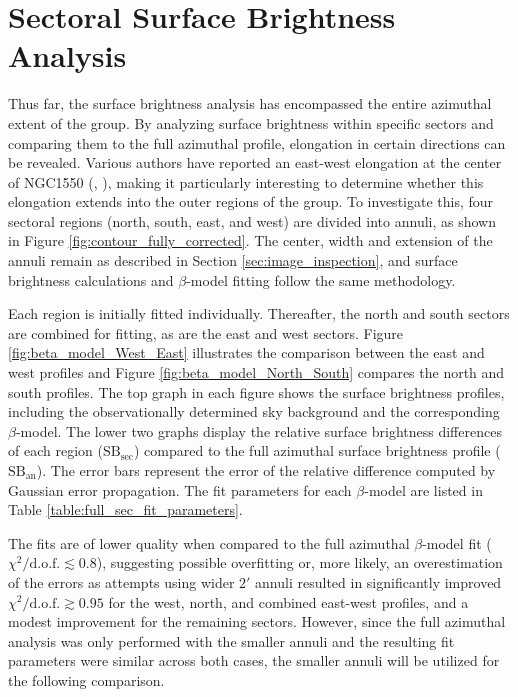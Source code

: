 \section{Sectoral Surface Brightness Analysis}
Thus far, the surface brightness analysis has encompassed the entire azimuthal extent of the group. By analyzing surface brightness within specific sectors and comparing them to the full azimuthal profile, elongation in certain directions can be revealed. Various authors have reported an east-west elongation at the center of NGC1550 (\cite{Sun_2003}, \cite{Kolokythas_2020}), making it particularly interesting to determine whether this elongation extends into the outer regions of the group. To investigate this, four sectoral regions (north, south, east, and west) are divided into annuli, as shown in Figure \ref{fig:contour_fully_corrected}. The center, width and extension of the annuli remain as described in Section \ref{sec:image_inspection}, and surface brightness calculations and \(\beta\)-model fitting follow the same methodology.

Each region is initially fitted individually. Thereafter, the north and south sectors are combined for fitting, as are the east and west sectors. Figure \ref{fig:beta_model_West_East} illustrates the comparison between the east and west profiles and Figure \ref{fig:beta_model_North_South} compares the north and south profiles. The top graph in each figure shows the surface brightness profiles, including the observationally determined sky background and the corresponding \(\beta\)-model. The lower two graphs display the relative surface brightness differences of each region (\(\text{SB}_\text{sec}\)) compared to the full azimuthal surface brightness profile (\(\text{SB}_\text{an}\)). The error bars represent the error of the relative difference computed by Gaussian error propagation. The fit parameters for each \(\beta\)-model are listed in Table \ref{table:full_sec_fit_parameters}. 

The fits are of lower quality when compared to the full azimuthal \(\beta\)-model fit ($\chi^2 / \text{d.o.f.} \lesssim 0.8$), suggesting possible overfitting or, more likely, an overestimation of the errors as attempts using wider $2'$ annuli resulted in significantly improved $\chi^2 / \text{d.o.f.} \gtrsim 0.95$ for the west, north, and combined east-west profiles, and a modest improvement for the remaining sectors. However, since the full azimuthal analysis was only performed with the smaller annuli and the resulting fit parameters were similar across both cases, the smaller annuli will be utilized for the following comparison. 

